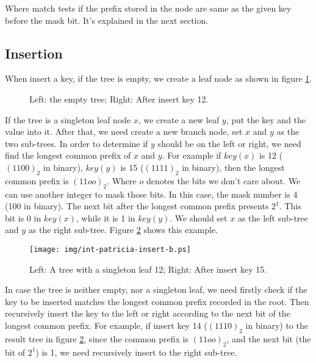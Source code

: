\documentclass{article}
\begin{document}
Where match tests if the prefix stored in the node are same as the given key
before the mask bit. It's explained in the next section.


\subsection{Insertion}
When insert a key, if the tree is empty, we create a leaf node as shown in figure
\ref{fig:int-patricia-insert-a}.

\begin{figure}[htbp]
  \centering
  \caption{Left: the empty tree; Right: After insert key 12.}
  \label{fig:int-patricia-insert-a}
\end{figure}

If the tree is a singleton leaf node $x$, we create a new leaf $y$,
put the key and the value into it. After that, we need create a new branch
node, set $x$ and $y$ as the two sub-trees.
In order to determine if $y$ should be on the left or right, we need
find the longest common prefix of $x$ and $y$. For example if $key(x)$
is 12 ($(1100)_2$ in binary), $key(y)$ is 15 ($(1111)_2$ in binary), then the longest
common prefix is $(11oo)_2$. Where $o$ denotes the bits we don't care about.
We can use another integer to mask those bits.
In this case, the mask number is 4 (100 in binary).
The next bit after the longest common prefix presents $2^1$. This bit is
0 in $key(x)$, while it is 1 in $key(y)$. We should set $x$ as the left
sub-tree and $y$ as the right sub-tree. Figure \ref{fig:int-patricia-insert-b}
shows this example.

\begin{figure}[htbp]
  \centering
  \texttt{[image: img/int-patricia-insert-b.ps]}
  \caption{Left: A tree with a singleton leaf 12; Right: After insert key 15.}
  \label{fig:int-patricia-insert-b}
\end{figure}

In case the tree is neither empty, nor a singleton leaf, we need
firstly check if the key to be inserted matches the longest common
prefix recorded in the root.
Then recursively insert the key to the left or right
according to the next bit of the longest common prefix.
For example, if insert key 14 ($(1110)_2$ in binary) to the result tree
in figure \ref{fig:int-patricia-insert-b}, since the common prefix is
$(11oo)_2$, and the next bit (the bit of $2^1$) is 1, we need recursively
insert to the right sub-tree.
\end{document}
